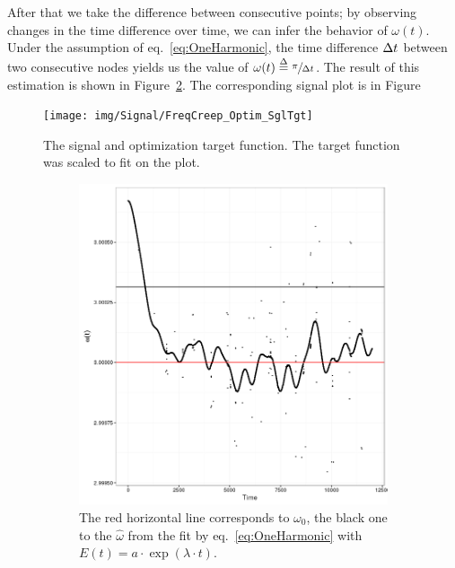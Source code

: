 \documentclass{article}
\newcommand{\deq}{\overset{\Delta}{=}}
\begin{document}
After that we take the difference between consecutive points; by observing changes in the time difference over time, we can infer the behavior of $\omega(t)$. Under the assumption of eq.~\eqref{eq:OneHarmonic}, the time difference $\dt$ between two consecutive nodes yields us the value of $\omega(t) \deq \sfrac{\pi}{\dt}$. The result of this estimation is shown in Figure~\ref{fig:WCreep_plot}. The corresponding signal plot is in Figure~
\begin{figure}[h]
	\centering
	\texttt{[image: img/Signal/FreqCreep\_Optim\_SglTgt]}
	\caption{The signal and optimization target function. The target function was scaled to fit on the plot.\label{fig:Optim_SglTgt}}
\end{figure}
\begin{figure}[h]
	\begin{subfigure}{.5\textwidth}
		\centering
		\includegraphics[scale=.5]{img/Signal/FreqCreep_W_plot}
		\caption{The red horizontal line corresponds to $\omega_0$, the black one to the $\hat{\omega}$ from the fit by eq.~\eqref{eq:OneHarmonic} with $E(t) = a\cdot \exp(\lambda\cdot t)$.\label{fig:WCreep_plot}}
	\end{subfigure}
	\begin{subfigure}{.5\textwidth}
		\centering

\end{subfigure}
\end{figure}
\end{document}
